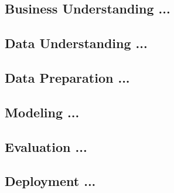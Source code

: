 \documentclass[11pt]{article}
\begin{document}
    \subsection{Business Understanding ...}\label{subsec:businessunderstanding}

    \subsection{Data Understanding ...}\label{subsec:dataunderstanding}

    \subsection{Data Preparation ...}\label{subsec:datapreparation}

    \subsection{Modeling ...}\label{subsec:modeling}

    \subsection{Evaluation ...}\label{subsec:evaluation}

    \subsection{Deployment ...}\label{subsec:deployment}
\end{document}
